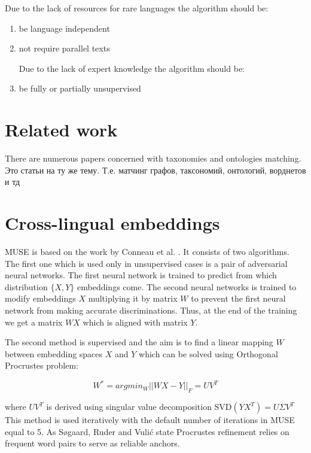 \documentclass[11pt,a4paper]{article}
\begin{document}
Due to the lack of resources for rare languages	the algorithm should be:
\begin{enumerate}
	
	\item be language independent
	
	\item not require parallel texts
	
	
	Due to the lack of expert knowledge the algorithm should be:
	
	\item be fully or partially unsupervised
\end{enumerate}

\section{Related work}
There are numerous papers concerned with taxonomies and ontologies matching.
\foreignlanguage{russian}{Это статьи на ту же тему. Т.е. матчинг графов, таксономий, онтологий, ворднетов и тд}
\section{Cross-lingual embeddings}

MUSE is based on the work by Conneau et al. \cite{muse}. It consists of two algorithms. The first one which is used only in unsupervised cases is a pair of adversarial neural networks. The first neural network is trained to predict from which distribution $\{X, Y\}$ embeddings come. The second neural networks is trained to modify embeddings $X$ multiplying it by matrix $W$ to prevent the first neural network from making accurate discriminations. Thus, at the end of the training we get a matrix $WX$ which is aligned with matrix $Y$.

The second method is supervised and the aim is to find a linear mapping $W$ between embedding spaces $X$ and $Y$ which can be solved using Orthogonal Procrustes problem:

$$ W^* = argmin_W ||WX - Y||_F = UV^T$$

where $UV^T$ is derived using singular value decomposition SVD$(YX^T) = U \Sigma V^T$
This method is used iteratively with the default number of iterations in MUSE equal to 5. As Søgaard, Ruder and Vulić state Procrustes refinement relies on frequent word pairs to serve as reliable anchors.
\end{document}
